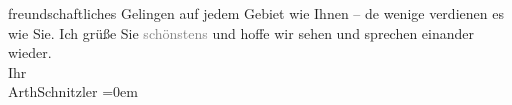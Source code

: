 \begin{ledgroupsized}[t]{13cm}
                    freundschaftliches Gelingen auf jedem Gebiet wie Ihnen – de{\geminationn} wenige verdienen es wie Sie.\pend
           \pstart
           Ich grüße Sie \textcolor{gray}{schönstens} und hoffe wir sehen und sprechen
                    einander wieder.{\\[\baselineskip]}Ihr{\\[\baselineskip]}\spacefill\mbox{ArthSchnitzler}\pend
           \leftskip=0em{}\endnumbering{}\end{ledgroupsized}  \newcommand{\dateiname}{L02536}\newcommand{\titel}{Arthur Schnitzler an Robert Adam, 12. 6. 1930}\newcommand{\editorInnen}{Martin Anton Müller und Gerd-Hermann Susen}
      